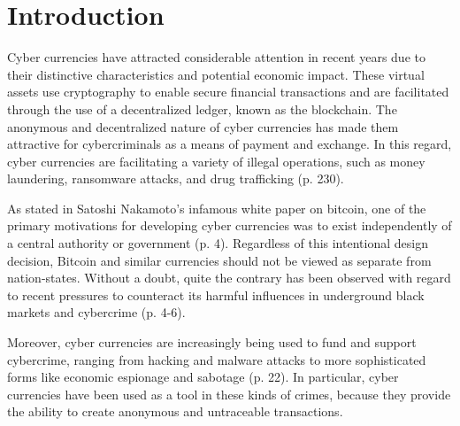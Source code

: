\chapter{Introduction}


Cyber currencies have attracted considerable attention in recent years due to their distinctive characteristics and potential economic impact. These virtual assets use cryptography to enable secure financial transactions and are facilitated through the use of a decentralized ledger, known as the blockchain. The anonymous and decentralized nature of cyber currencies has made them attractive for cybercriminals as a means of payment and exchange. In this regard, cyber currencies are facilitating a variety of illegal operations, such as money laundering, ransomware attacks, and drug trafficking \cite{bohme_bitcoin_2015} (p. 230).

As stated in Satoshi Nakamoto's infamous white paper on bitcoin, one of the primary motivations for developing cyber currencies was to exist independently of a central authority or government \cite{nakamoto_bitcoin_nodate} (p. 4). Regardless of this intentional design decision, Bitcoin and similar currencies should not be viewed as separate from nation-states. Without a doubt, quite the contrary has been observed with regard to recent pressures to counteract its harmful influences in underground black markets and cybercrime \cite{ablon_markets_2014} (p. 4-6).

Moreover, cyber currencies are increasingly being used to fund and support cybercrime, ranging from hacking and malware attacks to more sophisticated forms like economic espionage and sabotage \cite{reuter_information_2019} (p. 22). In particular, cyber currencies have been used as a tool in these kinds of crimes, because they provide the ability to create anonymous and untraceable transactions. 

